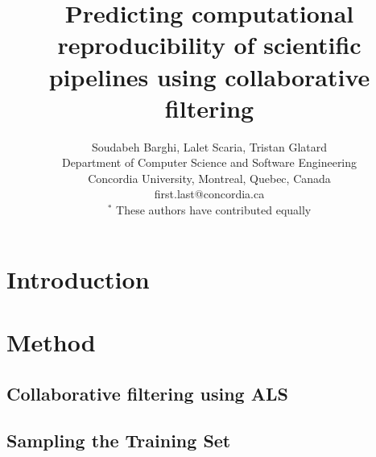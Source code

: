 \documentclass[10pt, conference, compsocconf]{IEEEtran}
\begin{document}
\title{Predicting computational reproducibility of scientific pipelines using collaborative filtering}

\author{Soudabeh Barghi, Lalet Scaria, Tristan Glatard\\
  Department of Computer Science and Software Engineering\\ Concordia University, Montreal, Quebec, Canada\\
  {first.last}@concordia.ca\\
  $^*$ These authors have contributed equally
}

\maketitle

\begin{abstract}
\end{abstract}


\section{Introduction}






\section{Method}

\subsection{Collaborative filtering using ALS}


\subsection{Sampling the Training Set}
\end{document}
